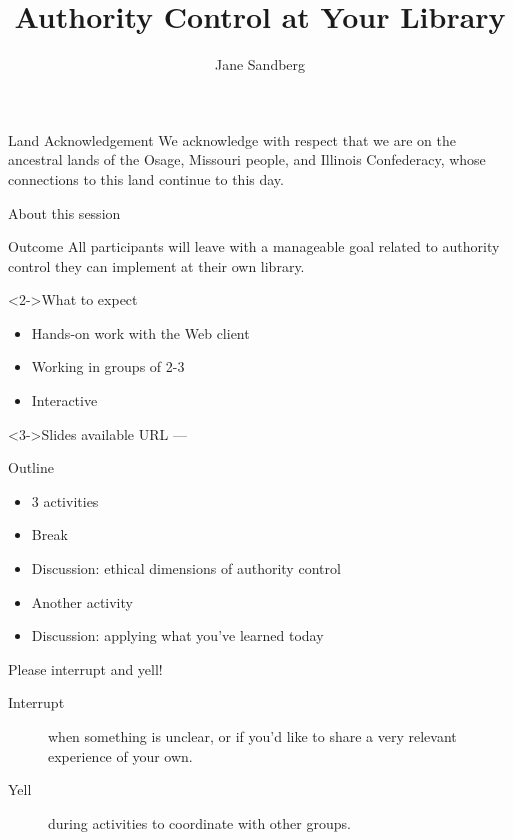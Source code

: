 \documentclass{beamer}
\begin{document}
\title{Authority Control at Your Library}
\author{Jane Sandberg}


\begin{frame}
 \titlepage
\end{frame}


\begin{frame}{Land Acknowledgement}
We acknowledge with respect that we are on the ancestral lands of the Osage, Missouri people, and Illinois Confederacy, whose connections to this land continue to this day.

\end{frame}


\begin{frame}{About this session}
\begin{block}{Outcome}
 All participants will leave with a manageable goal related to authority control they can implement at their own library.
\end{block}
\begin{block}<2->{What to expect}
\begin{itemize}
 \item Hands-on work with the Web client
 \item Working in groups of 2-3
 \item Interactive
\end{itemize}

\end{block}
\begin{block}<3->{Slides available}
URL ---
\end{block}


\end{frame}

\begin{frame}{Outline}
\begin{itemize}
 \item 3 activities
 \item Break
 \item Discussion: ethical dimensions of authority control
 \item Another activity
 \item Discussion: applying what you've learned today
\end{itemize}


\end{frame}

\begin{frame}{Please interrupt and yell!}

 \begin{description}
  \item[Interrupt] when something is unclear, or if you'd like to share a very relevant experience of your own.
  \item[Yell] during activities to coordinate with other groups.
 \end{description}


\end{frame}
\end{document}
